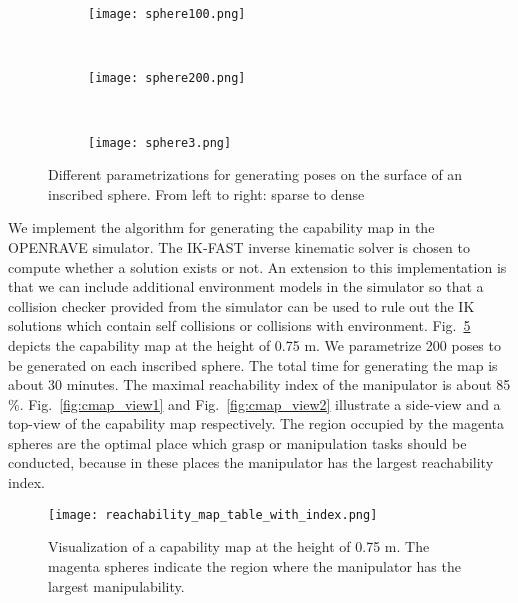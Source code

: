 \begin{figure}[!htbp]
    \centering
    \begin{subfigure}[b]{0.25\textwidth}
        \texttt{[image: sphere100.png]}
        \caption{}
        \label{fig:sphere1}
    \end{subfigure}
    ~ %
    \begin{subfigure}[b]{0.25\textwidth}
        \texttt{[image: sphere200.png]}
        \caption{}
        \label{fig:sphere2}
    \end{subfigure}
    ~ %
    \begin{subfigure}[b]{0.25\textwidth}
        \texttt{[image: sphere3.png]}
        \caption{}
        \label{fig:sphere3}
    \end{subfigure}
    \caption{Different parametrizations for generating poses on the surface of an inscribed sphere. From left to right: sparse to dense}\label{fig:inscribed_sphere}
\end{figure}

We implement the algorithm for generating the capability map in the OPENRAVE \todo{\cite{}} simulator. The IK-FAST inverse kinematic solver is chosen to compute  whether a solution exists or not. An extension to this implementation is that we can include additional environment models in the simulator so that a collision checker provided from the simulator can be used to rule out the IK solutions which contain self collisions or collisions with environment. Fig.~\ref{fig:cmap} depicts the capability map at the height of 0.75 m. We parametrize 200 poses to be generated on each inscribed sphere. The total time for generating the map is about 30 minutes. The maximal reachability index of the manipulator is about 85 \%. Fig.~\ref{fig:cmap_view1} and Fig.~\ref{fig:cmap_view2} illustrate a side-view and a top-view of the capability map respectively. The region occupied by the magenta spheres are the optimal place which grasp or manipulation tasks should be conducted, because in these places the manipulator has the largest reachability index. 

\begin{figure}[!htbp]
\centering
\texttt{[image: reachability\_map\_table\_with\_index.png]}
\captionsetup{justification=raggedright}
\caption{Visualization of a capability map at the height  of 0.75 m. The magenta spheres indicate the region where the manipulator has the largest manipulability.}
\label{fig:cmap}       %
\end{figure} 

